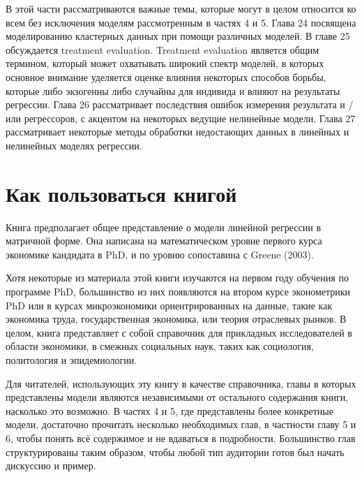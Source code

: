 В этой части рассматриваются важные темы, которые могут в целом относится ко всем без исключения моделям рассмотренным в частях 4 и 5. Глава 24 посвящена моделированию кластерных данных при помощи различных моделей. В главе 25 обсуждается treatment evaluation. Treatment evaluation является общим термином, который может охватывать широкий спектр моделей, в которых основное внимание уделяется оценке влияния некоторых способов борьбы, которые либо экзогенны либо случайны для индивида и влияют на результаты регрессии. Глава 26 рассматривает последствия ошибок измерения результата и / или  регрессоров, с акцентом на некоторых ведущие нелинейные модели. Глава 27 рассматривает некоторые методы обработки недостающих данных в линейных и нелинейных моделях регрессии.

\section{Как пользоваться книгой}

Книга предполагает общее представление о модели линейной регрессии в матричной форме. Она написана на математическом уровне первого курса экономике кандидата в PhD, и по уровню сопоставина с  Greene (2003).


	Хотя некоторые из материала этой книги изучаются на первом году обучения по программе PhD, большинство из них появляются на втором курсе эконометрики PhD или в курсах микроэкономики ориентрированных на данные, такие как экономика труда, государственная экономика, или теория отраслевых рынков. В целом, книга представляет с собой справочник для прикладных исследователей в области экономики, в смежных социальных наук, таких как социология, политология и эпидемиологии.
	
	
	Для читателей, использующих эту книгу в качестве справочника, главы в которых представлены модели являются независимыми от остального содержания книги, насколько это возможно. В частях 4 и 5, где представлены более конкретные модели, достаточно прочитать несколько необходимых глав, в частности главу 5 и 6, чтобы понять всё содержимое и не вдаваться в подробности. Большинство глав структурированы таким образом, чтобы любой тип аудитории готов был начать дискуссию и пример.
	
